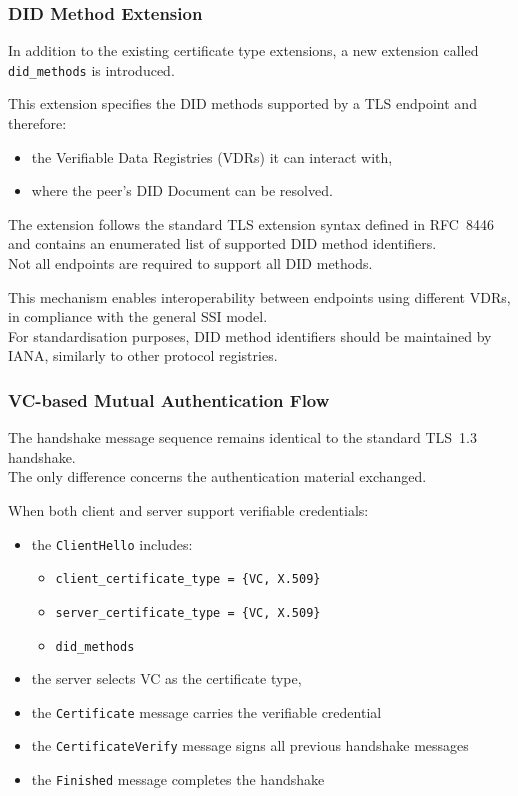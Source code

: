\subsubsection*{DID Method Extension}

\noindent
In addition to the existing certificate type extensions, a new extension called \texttt{did\_methods} is introduced.

\noindent
This extension specifies the DID methods supported by a TLS endpoint and therefore:
\begin{itemize}
    \item the Verifiable Data Registries (VDRs) it can interact with,
    \item where the peer’s DID Document can be resolved.
\end{itemize}

\noindent
The extension follows the standard TLS extension syntax defined in RFC~8446 and contains an enumerated list of supported DID method identifiers. \\ 
Not all endpoints are required to support all DID methods.
\medskip 

\noindent
This mechanism enables interoperability between endpoints using different VDRs, in compliance with the general SSI model.\\
For standardisation purposes, DID method identifiers should be maintained by IANA, similarly to other protocol registries.

\subsubsection*{VC-based Mutual Authentication Flow}

\noindent
The handshake message sequence remains identical to the standard TLS~1.3 handshake.\\ 
The only difference concerns the authentication material exchanged.
\medskip

\noindent
When both client and server support verifiable credentials:
\begin{itemize}
    \item the \texttt{ClientHello} includes:
    \begin{itemize}
        \item \texttt{client\_certificate\_type = \{VC, X.509\}}
        \item \texttt{server\_certificate\_type = \{VC, X.509\}}
        \item \texttt{did\_methods}
    \end{itemize}
    \item the server selects VC as the certificate type,
    \item the \texttt{Certificate} message carries the verifiable credential
    \item the \texttt{CertificateVerify} message signs all previous handshake messages
    \item the \texttt{Finished} message completes the handshake
\end{itemize}

